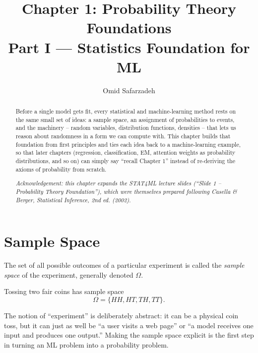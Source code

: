 \documentclass[11pt]{article}
\title{Chapter 1: Probability Theory Foundations \\ \large Part I --- Statistics Foundation for ML}
\author{Omid Safarzadeh}
\date{}
\begin{document}
\maketitle

\begin{abstract}
\noindent
Before a single model gets fit, every statistical and machine-learning method
rests on the same small set of ideas: a sample space, an assignment of
probabilities to events, and the machinery -- random variables, distribution
functions, densities -- that lets us reason about randomness in a form we can
compute with. This chapter builds that foundation from first principles and
ties each idea back to a machine-learning example, so that later chapters
(regression, classification, EM, attention weights as probability
distributions, and so on) can simply say ``recall Chapter 1'' instead of
re-deriving the axioms of probability from scratch.

\emph{Acknowledgement: this chapter expands the STAT4ML lecture slides
(``Slide 1 -- Probability Theory Foundation''), which were themselves prepared
following Casella \& Berger, \emph{Statistical Inference}, 2nd ed. (2002).}
\end{abstract}

\tableofcontents

\section{Sample Space}

\begin{definition}
The set of all possible outcomes of a particular experiment is called the
\emph{sample space} of the experiment, generally denoted $\Omega$.
\end{definition}

\begin{example}
Tossing two fair coins has sample space
\[
  \Omega = \{HH, HT, TH, TT\}.
\]
\end{example}

The notion of ``experiment'' is deliberately abstract: it can be a physical
coin toss, but it can just as well be ``a user visits a web page'' or ``a
model receives one input and produces one output.'' Making the sample space
explicit is the first step in turning an ML problem into a probability
problem.
\end{document}
